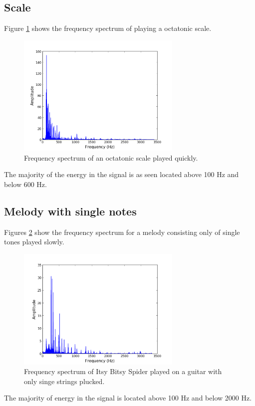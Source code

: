 \subsection{Scale}
Figure \ref{fig:scale_fast} shows the frequency spectrum of playing a octatonic scale.
\begin{figure}[H]
\centering
\includegraphics[width=0.7\textwidth]{figures/freqanal/scale_fast.png}
\caption{Frequency spectrum of an octatonic scale played quickly.}
\label{fig:scale_fast}
\end{figure}
The majority of the energy in the signal is as seen located above 100 Hz and below 600 Hz.

\subsection{Melody with single notes}
Figures \ref{fig:melody_single} show the frequency spectrum for a melody consisting only of single tones played slowly.
\begin{figure}[H]
\centering
\includegraphics[width=0.7\textwidth]{figures/freqanal/melody_single.png}
\caption{Frequency spectrum of Itsy Bitsy Spider played on a guitar with only singe strings plucked.}
\label{fig:melody_single}
\end{figure}
The majority of energy in the signal is located above 100 Hz and below 2000 Hz.
